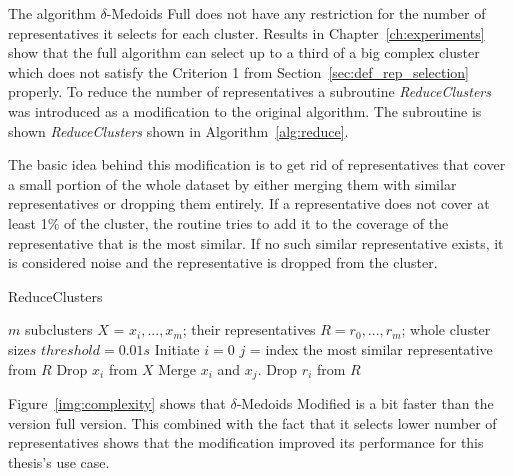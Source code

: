 \documentclass[thesis=B,english]{FITthesis}[2012/10/20]
\begin{document}
The algorithm $\delta$-Medoids Full does not have any restriction for the number of representatives it selects for each cluster.
Results in Chapter~\ref{ch:experiments} show that the full algorithm can select up to a third of a big complex cluster which does not satisfy the Criterion 1 from Section~\ref{sec:def_rep_selection} properly.
To reduce the number of representatives a subroutine \textit{ReduceClusters} was introduced as a modification to the original algorithm.
The subroutine is shown \textit{ReduceClusters} shown in Algorithm~\ref{alg:reduce}.

The basic idea behind this modification is to get rid of representatives that cover a small portion of the whole dataset by either merging them with similar representatives or dropping them entirely.
If a representative does not cover at least 1\% of the cluster, the routine tries to add it to the coverage of the representative that is the most similar.
If no such similar representative exists, it is considered noise and the representative is dropped from the cluster.

\begin{algorithm}
    \caption{ReduceClusters}
    \label{alg:reduce}
    \begin{algorithmic}[1]
        \INPUT $m$ subclusters $X$ = $x_i, ..., x_m$; their representatives $R = r_0, ..., r_m$; whole cluster size$s$
        \STATE $threshold = 0.01s$
        \STATE Initiate $i = 0$
                    \STATE $j$ = index the most similar representative from $R$
                        \STATE Drop $x_i$ from $X$
                    \ELSE
                        \STATE Merge $x_i$ and $x_j$.
                    \ENDIF
                    \STATE Drop $r_i$ from $R$
                \ENDIF
            \ENDWHILE
        \ENDIF
    \end{algorithmic}
\end{algorithm}

Figure~\ref{img:complexity} shows that $\delta$-Medoids Modified is a bit faster than the version full version.
This combined with the fact that it selects lower number of representatives shows that the modification improved its performance for this thesis's use case.
\end{document}
